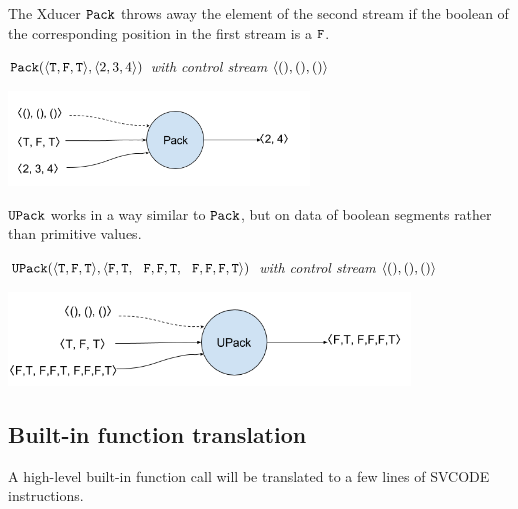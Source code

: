 The Xducer $\mathtt{Pack}$ throws away the element of the second stream if the boolean of the corresponding position in the first stream is a $\mathtt{F}$. 

\begin{example} \emph{$\pack({\<\T,\F,\T\'>}, \<2,3,4 \'>)$ with control stream $\< (),(), () \'>$}\\
	\begin{center}
		\includegraphics[width=0.6\textwidth]{fig/packxducer.png}
	\end{center}
\end{example}

$\mathtt{UPack}$ works in a way similar to $\mathtt{Pack}$, but on data of boolean segments rather than primitive values.
\begin{example} \emph{$\upack({\<\T,\F,\T\'>}, \< \F,\T,\ \ \F,\F,\T, \ \ \F,\F,\F, \T\'>)$ with control stream $\< (),(), () \'>$}\\
	\begin{center}
		\includegraphics[width=0.8\textwidth]{fig/upackxducer.png}
	\end{center}
\end{example}


\subsection{Built-in function translation}
A high-level built-in function call will be translated to a few lines of SVCODE instructions.

